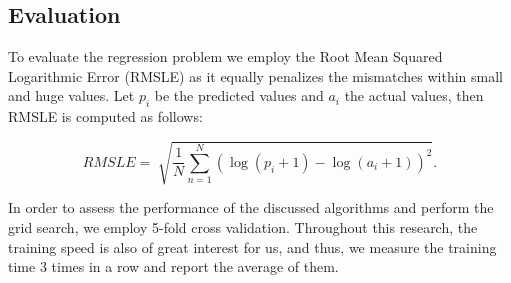 \subsection{Evaluation}

To evaluate the regression problem we employ the Root Mean Squared Logarithmic Error (RMSLE) as it equally penalizes the mismatches within small and huge values. Let $p_i$ be the predicted values and $a_i$ the actual values, then RMSLE is computed as follows:

$$ RMSLE = \sqrt[]{\frac{1}{N}\sum_{n = 1}^N (\log(p_i + 1) - \log(a_i + 1))^2}. $$

In order to assess the performance of the discussed algorithms and perform the grid search, we employ 5-fold cross validation. Throughout this research, the training speed is also of great interest for us, and thus, we measure the training time 3 times in a row and report the average of them.



